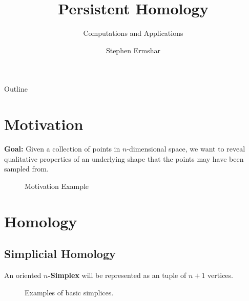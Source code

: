 

\title{Persistent Homology}
\subtitle{Computations and Applications}
\author{Stephen Ermshar}
\date{}






\begin{frame}
    \titlepage
\end{frame}

\begin{frame}{Outline}
	\tableofcontents
\end{frame}

\section[Motivation]{Motivation}
\begin{frame}
	\textbf{Goal:} Given a collection of points in \(n\)-dimensional space, we want to reveal qualitative properties of an underlying shape that the points may have been sampled from.

	\begin{figure}
		
		\caption{Motivation Example}
	\end{figure}
\end{frame}

\section[Homology]{Homology}
\subsection{Simplicial Homology}
\begin{frame}
	\begin{definition}
		An oriented \textbf{\(n\)-Simplex} will be represented as an tuple of \(n+1\) vertices.
	\end{definition}
	\begin{figure}
		
		\caption{Examples of basic simplices.}
	\end{figure}
\end{frame}


